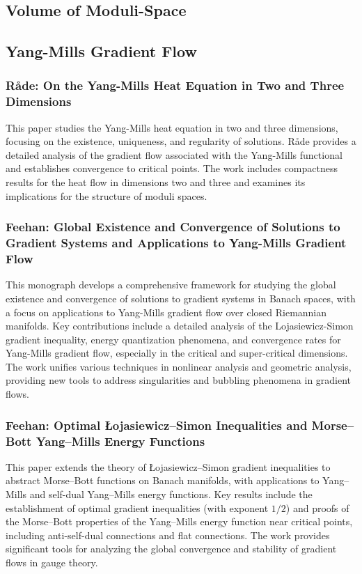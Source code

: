 \documentclass[10pt, letterpaper]{article}
\begin{document}
\vspace{1cm}


\subsection{Volume of Moduli-Space}






\subsection{Yang-Mills Gradient Flow}

\subsubsection{Råde: On the Yang-Mills Heat Equation in Two and Three Dimensions \cite{rade1992heat}} 
This paper studies the Yang-Mills heat equation in two and three dimensions, focusing on the existence, uniqueness, and regularity of solutions. Råde provides a detailed analysis of the gradient flow associated with the Yang-Mills functional and establishes convergence to critical points. The work includes compactness results for the heat flow in dimensions two and three and examines its implications for the structure of moduli spaces.

\subsubsection{Feehan: Global Existence and Convergence of Solutions to Gradient Systems and Applications to Yang-Mills Gradient Flow \cite{feehan2016gradient}} 
This monograph develops a comprehensive framework for studying the global existence and convergence of solutions to gradient systems in Banach spaces, with a focus on applications to Yang-Mills gradient flow over closed Riemannian manifolds. Key contributions include a detailed analysis of the Lojasiewicz-Simon gradient inequality, energy quantization phenomena, and convergence rates for Yang-Mills gradient flow, especially in the critical and super-critical dimensions. The work unifies various techniques in nonlinear analysis and geometric analysis, providing new tools to address singularities and bubbling phenomena in gradient flows.


\subsubsection{Feehan: Optimal \L{}ojasiewicz–Simon Inequalities and Morse–Bott Yang–Mills Energy Functions \cite{feehan2020lojasiewicz}} 
This paper extends the theory of \L{}ojasiewicz–Simon gradient inequalities to abstract Morse–Bott functions on Banach manifolds, with applications to Yang–Mills and self-dual Yang–Mills energy functions. Key results include the establishment of optimal gradient inequalities (with exponent \(1/2\)) and proofs of the Morse–Bott properties of the Yang–Mills energy function near critical points, including anti-self-dual connections and flat connections. The work provides significant tools for analyzing the global convergence and stability of gradient flows in gauge theory.
\end{document}

